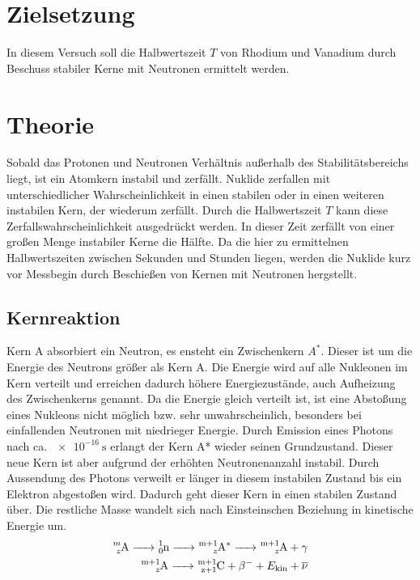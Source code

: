 \section{Zielsetzung}
In diesem Versuch soll die Halbwertszeit $T$ von Rhodium und Vanadium durch Beschuss stabiler Kerne mit Neutronen ermittelt werden.

\section{Theorie}
\label{sec:Theorie}
Sobald das Protonen und Neutronen Verhältnis außerhalb des Stabilitätsbereichs liegt, ist ein Atomkern instabil und zerfällt.
Nuklide zerfallen mit unterschiedlicher Wahrscheinlichkeit in einen stabilen oder in einen weiteren instabilen Kern, der wiederum zerfällt.
Durch die Halbwertszeit $T$ kann diese Zerfallswahrscheinlichkeit ausgedrückt werden.
In dieser Zeit zerfällt von einer großen Menge instabiler Kerne die Hälfte.
Da die hier zu ermittelnen Halbwertszeiten zwischen Sekunden und Stunden liegen, werden die Nuklide kurz vor Messbegin durch Beschießen von Kernen mit Neutronen hergstellt.

\subsection{Kernreaktion}
\label{subsec:Kernreaktion}
Kern A absorbiert ein Neutron, es ensteht ein Zwischenkern $A^*$.
Dieser ist um die Energie des Neutrons größer als Kern A.
Die Energie wird auf alle Nukleonen im Kern verteilt und erreichen dadurch höhere Energiezustände, auch Aufheizung des Zwischenkerns genannt.
Da die Energie gleich verteilt ist, ist eine Abstoßung eines Nukleons nicht möglich bzw. sehr unwahrscheinlich, besonders bei einfallenden Neutronen mit niedrieger Energie.
Durch Emission eines Photons nach ca. $\SI{e-16}{\second}$ erlangt der Kern A* wieder seinen Grundzustand.
Dieser neue Kern ist aber aufgrund der erhöhten Neutronenanzahl instabil.
Durch Aussendung des Photons verweilt er länger in diesem instabilen Zustand bis ein Elektron abgestoßen wird.
Dadurch geht dieser Kern in einen stabilen Zustand über.
Die restliche Masse wandelt sich nach Einsteinschen Beziehung in kinetische Energie um.
\begin{align*}
    \ce{^{m}_{z}A -> ^{1}_0n -> ^{m{+1}}_{z}{A^{*}} -> ^{m{+1}}_{z}A} + \gamma\\
    \ce{^{m{+1}}_{z}A -> ^{m{+1}}_{z{+1}}C }+ \beta ^{-} + E_{\text{kin}} + \overline{\nu}
\end{align*}
